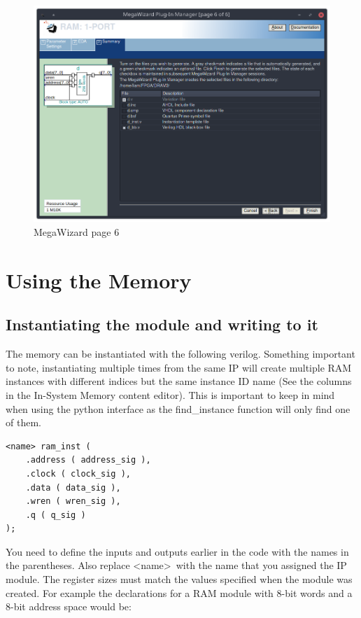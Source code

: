 \documentclass[letter,12pt]{article}
\begin{document}
\begin{figure}[H]
  \centering
  \includegraphics[width=.83\linewidth]{pics/Mega6.png}
  \caption{MegaWizard page 6}
\end{figure}


\section{Using the Memory}
\subsection{Instantiating the module and writing to it}

The memory can be instantiated with the following verilog. Something important to note, instantiating multiple times from the same IP will create multiple RAM instances with different indices but the same instance ID name (See the columns in the In-System Memory content editor). This is important to keep in mind when using the python interface as the find\_instance function will only find one of them.

\begin{verbatim}
<name> ram_inst (
    .address ( address_sig ),
    .clock ( clock_sig ),
    .data ( data_sig ),
    .wren ( wren_sig ),
    .q ( q_sig )
);
\end{verbatim}

You need to define the inputs and outputs earlier in the code with the names in the parentheses. Also replace \textless name\textgreater\ with the name that you assigned the IP module. The register sizes must match the values specified when the module was created. For example the declarations for a RAM module with 8-bit words and a 8-bit address space would be:
\end{document}
